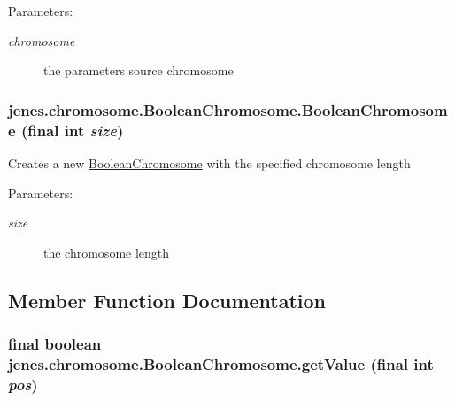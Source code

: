 \begin{Desc}
\item[Parameters:]
\begin{description}
\item[{\em chromosome}]the parameters source chromosome \end{description}
\end{Desc}
\hypertarget{classjenes_1_1chromosome_1_1_boolean_chromosome_ea950688e012d2bfe97f4f24a3fc1db6}{
\subsubsection[BooleanChromosome]{\setlength{\rightskip}{0pt plus 5cm}jenes.chromosome.BooleanChromosome.BooleanChromosome (final int {\em size})}}
\label{classjenes_1_1chromosome_1_1_boolean_chromosome_ea950688e012d2bfe97f4f24a3fc1db6}


Creates a new \hyperlink{classjenes_1_1chromosome_1_1_boolean_chromosome}{BooleanChromosome} with the specified chromosome length 

\begin{Desc}
\item[Parameters:]
\begin{description}
\item[{\em size}]the chromosome length \end{description}
\end{Desc}


\subsection{Member Function Documentation}
\hypertarget{classjenes_1_1chromosome_1_1_boolean_chromosome_6edb214f001732cfd6af9bbac3a23515}{
\subsubsection[getValue]{\setlength{\rightskip}{0pt plus 5cm}final boolean jenes.chromosome.BooleanChromosome.getValue (final int {\em pos})}}
\label{classjenes_1_1chromosome_1_1_boolean_chromosome_6edb214f001732cfd6af9bbac3a23515}



